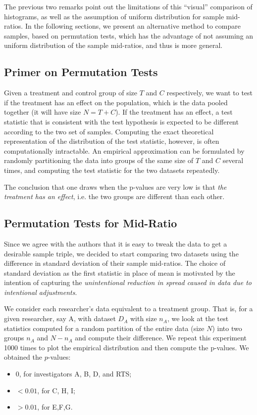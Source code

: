 \documentclass{article}
\begin{document}
The previous two remarks point out the limitations of this ``visual''
comparison of histograms, as well as the assumption of uniform distribution for
sample mid-ratios. 
In the following sections, we present an alternative method to compare samples, based on permutation tests, which has the advantage of not assuming an uniform distribution of the sample mid-ratios, and thus is more general.



    \subsection{Primer on Permutation
Tests}\label{quick-primer-to-permutation-tests}

Given a treatment and control group of size \(T\) and \(C\)
respectively, we want to test if the treatment has an
effect on the population, which is the data pooled together
(it will have size \(N = T+C\)).
If the
treatment has an effect, a test statistic that is consistent with the test
hypothesis is expected to be different according to the two set of samples.
Computing the exact theoretical representation of the distribution of the test statistic, however, is often computationally
intractable. 
An empirical approximation can be formulated by randomly
partitioning the data into groups of the same size of \(T\) and \(C\) several times, and
computing the test statistic for the two datasets repeatedly. 

The conclusion that one draws when the p-values are very low is that \textit{the
treatment has an effect}, i.e. the two groups are different than each other.


    \subsection{Permutation Tests for
Mid-Ratio}\label{permutation-tests-for-mid-ratio}

Since we agree with the authors that it is easy to tweak
the data to get a desirable sample triple, we decided to start comparing two datasets using the difference in
standard deviation of their sample mid-ratios. 
The choice of standard deviation as the first statistic in place of mean
is motivated by the intention of capturing
the \textit{unintentional reduction in spread caused in data due to
intentional adjustments}.

We consider each researcher's data equivalent to a treatment group. 
That is, for a
given researcher, say A, with dataset \(D_A\) with size \(n_A\), we look
at the test statistics computed for a random partition of the entire data
(size \(N\)) into two groups \(n_A\) and \(N-n_A\) and compute their difference. 
We repeat this experiment 1000 times to plot the empirical
distribution and then compute the p-values. 
We obtained the $p$-values:
\begin{itemize} 
\item $0$, for investigators A, B,
D, and RTS;
\item \(<0.01\), for C, H, I;
\item  \(>0.01\), for  E,F,G.
\end{itemize}
\end{document}

